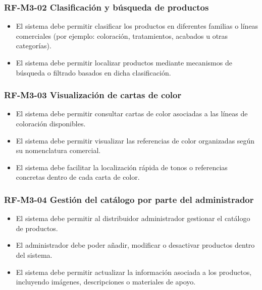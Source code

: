 \vspace{-0.75em}
\subsubsection{RF-M3-02 Clasificación y búsqueda de productos}
\vspace{-1em}

\begin{itemize}
    \item El sistema debe permitir clasificar los productos en diferentes familias o líneas comerciales (por ejemplo: coloración, tratamientos, acabados u otras categorías).
    \item El sistema debe permitir localizar productos mediante mecanismos de búsqueda o filtrado basados en dicha clasificación.
\end{itemize}

\vspace{-0.75em}
\subsubsection{RF-M3-03 Visualización de cartas de color}
\vspace{-1em}

\begin{itemize}
    \item El sistema debe permitir consultar cartas de color asociadas a las líneas de coloración disponibles.
    \item El sistema debe permitir visualizar las referencias de color organizadas según su nomenclatura comercial.
    \item El sistema debe facilitar la localización rápida de tonos o referencias concretas dentro de cada carta de color.
\end{itemize}

\vspace{-0.75em}
\subsubsection{RF-M3-04 Gestión del catálogo por parte del administrador}
\vspace{-1em}

\begin{itemize}
    \item El sistema debe permitir al distribuidor administrador gestionar el catálogo de productos.
    \item El administrador debe poder añadir, modificar o desactivar productos dentro del sistema.
    \item El sistema debe permitir actualizar la información asociada a los productos, incluyendo imágenes, descripciones o materiales de apoyo.
\end{itemize}

